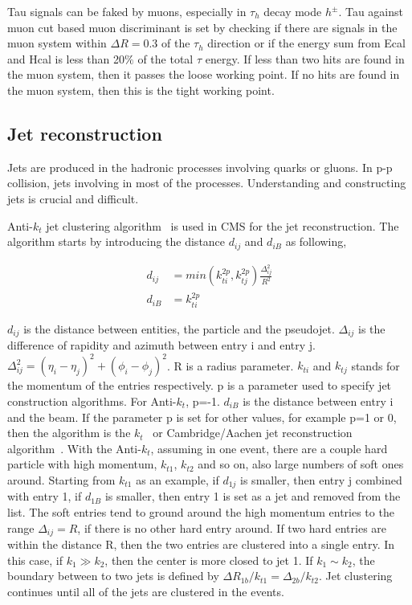 Tau signals can be faked by muons, especially in $\tau_{h}$ decay mode $h^{\pm}$. Tau against muon cut based muon discriminant is set by checking if there are signals in the muon system within $\Delta R=0.3$ of the $\tau_{h}$ direction or if the energy sum from Ecal and Hcal is less than 20$\%$ of the total $\tau$ energy. If less than two hits are found in the muon system, then it passes the loose working point. If no hits are found in the muon system, then this is the tight working point. 

\subsection{Jet reconstruction}
Jets are produced in the hadronic processes involving quarks or gluons. In p-p collision, jets involving in most of the processes. Understanding and constructing jets is crucial and difficult. 

Anti-$k_{t}$ jet clustering algorithm~\cite{Cacciari:2008gp} is used in CMS for the jet reconstruction. The algorithm starts by introducing the distance $d_{ij}$ and $d_{iB}$ as following,

\begin{align*}
d_{ij}&=min(k_{ti}^{2p},k_{tj}^{2p})\frac{\Delta_{ij}^{2}}{R^{2}}\\
d_{iB}&=k_{ti}^{2p}
\end{align*}

$d_{ij}$ is the distance between entities, the particle and the pseudojet. $\Delta_{ij}$ is the difference of rapidity and azimuth between entry i and entry j. $\Delta_{ij}^{2}=(\eta_{i}-\eta_{j})^{2}+(\phi_{i}-\phi_{j})^{2}$. R is a radius parameter. $k_{ti}$ and $k_{tj}$ stands for the momentum of the entries respectively. p is a parameter used to specify jet construction algorithms.  For Anti-$k_{t}$, p=-1. $d_{iB}$ is the distance between entry i and the beam. If the parameter p is set for other values, for example p=1 or 0, then the algorithm is the $k_t$~\cite{ktalgo} or Cambridge/Aachen jet reconstruction algorithm~\cite{Aachenjetalgo}.  With the Anti-$k_{t}$, assuming in one event, there are a couple hard particle with high momentum, $k_{t1}$, $k_{t2}$ and so on, also large numbers of soft ones around. Starting from $k_{t1}$ as an example, if $d_{1j}$ is smaller, then entry j combined with entry 1, if $d_{1B}$ is smaller, then entry 1 is set as a jet and removed from the list. The soft entries tend to ground around the high momentum entries to the range $\Delta_{ij}= R$, if there is no other hard entry around. If two hard entries are within the distance R, then the two entries are clustered into a single entry. In this case, if $k_{1}\gg k_{2}$, then the center is more closed to jet 1. If $k_{1}\sim k_{2}$, the boundary between to two jets is defined by $\Delta R_{1b}/k_{t1}=\Delta_{2b}/k_{t2}$. Jet clustering continues until all of the jets are clustered in the events. 

